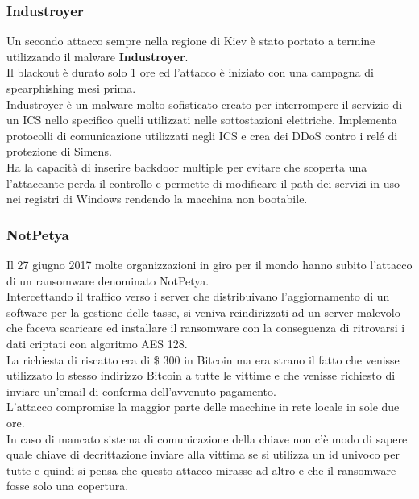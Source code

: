 \subsubsection{Industroyer}
Un secondo attacco sempre nella regione di Kiev è stato portato a termine utilizzando il malware \textbf{Industroyer}.\\
Il blackout è durato solo 1 ore ed l'attacco è iniziato con una campagna di spearphishing mesi prima.\\
Industroyer è un malware molto sofisticato creato per interrompere il servizio di un \acrfull{ICS} nello specifico quelli utilizzati nelle sottostazioni elettriche.
Implementa protocolli di comunicazione utilizzati negli \acrshort{ICS} e crea dei \acrshort{DDoS} contro i relé di protezione di Simens.\\
Ha la capacità di inserire backdoor multiple per evitare che scoperta una l'attaccante perda il controllo e permette di modificare il path dei servizi in uso nei registri di Windows rendendo la macchina non bootabile.

\subsubsection{NotPetya}
\label{subsub:notpetya}
Il 27 giugno 2017 molte organizzazioni in giro per il mondo hanno subito l'attacco di un ransomware denominato NotPetya.\\
Intercettando il traffico verso i server che distribuivano l'aggiornamento di un software per la gestione delle tasse, si veniva reindirizzati ad un server malevolo che faceva scaricare ed installare il ransomware con la conseguenza di ritrovarsi i dati criptati con algoritmo AES 128.\\
La richiesta di riscatto era di \$ 300 in Bitcoin ma era strano il fatto che venisse utilizzato lo stesso indirizzo Bitcoin a tutte le vittime e che venisse richiesto di inviare un'email di conferma dell'avvenuto pagamento.\\
L'attacco compromise la maggior parte delle macchine in rete locale in sole due ore.\\
In caso di mancato sistema di comunicazione della chiave non c'è modo di sapere quale chiave di decrittazione inviare alla vittima se si utilizza un id univoco per tutte e quindi si pensa che questo attacco mirasse ad altro e che il ransomware fosse solo una copertura.